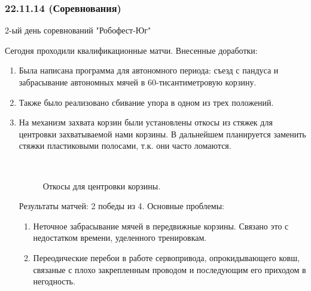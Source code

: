 \subsubsection{22.11.14 (Соревнования)}
\begin{center}
	2-ый день соревнований "Робофест-Юг"
\end{center}
Сегодня проходили квалификационные матчи.
\newline 
Внесенные  доработки:
\begin{enumerate}
	\item Была написана программа для автономного периода: съезд с пандуса и забрасывание автономных мячей в 60-тисантиметровую корзину.
	\item Также было реализовано сбивание упора в одном из трех положений.
	\item На механизм захвата корзин были установлены откосы из стяжек для центровки захватываемой нами корзины. В дальнейшем планируется заменить стяжки  пластиковыми полосами, т.к. они часто ломаются.
	\begin{figure}[H]
		\begin{minipage}[h]{0.2\linewidth}
			\center  
		\end{minipage}
		\begin{minipage}[h]{0.6\linewidth}
			\caption{Откосы для центровки корзины.
			}
		\end{minipage}
	\end{figure}
	Результаты матчей: 2 победы из 4. 
	\newline
    Основные проблемы:
    \begin{enumerate}
       \item Неточное забрасывание мячей в передвижные корзины. Связано это с недостатком времени, уделенного тренировкам.
       \item Переодические перебои в работе сервопривода, опрокидывающего ковш, связаные с плохо закрепленным проводом и последующим его приходом в негодность.
    \end{enumerate} 
\end{enumerate}
\fillpage